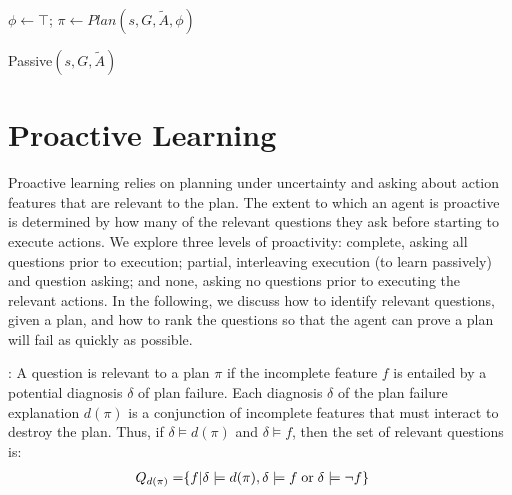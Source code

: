 \documentclass[letterpaper]{article}
\def\und#1{\noindent{\bf #1}:}
\begin{document}
\begin{algorithm}[t]
\SetLine
{}
 $\phi \leftarrow \top$; $\pi \leftarrow Plan(s, G, \tilde{A}, \phi)$\;
\caption{Passive$(s, G, \tilde{A})$}\label{alg:replan}
\end{algorithm}



\section{Proactive Learning}


Proactive learning relies on planning under uncertainty and asking about action
features that are relevant to the plan.  The extent to which an agent is
proactive is determined by how many of the relevant questions they ask before
starting to execute actions.  We explore three levels of proactivity: complete,
asking all questions prior to execution; partial, interleaving execution (to
learn passively) and question asking; and none, asking no questions prior to
executing the relevant actions.  In the following, we discuss how to identify
relevant questions, given a plan, and how to rank the questions so that the
agent can prove a plan will fail as quickly as possible.


\und{Relevant Questions}  A question is relevant to a plan
${\pi}$ if the incomplete feature $f$ is entailed by a potential
diagnosis $\delta$ of plan failure.  Each diagnosis $\delta$ of the plan
failure explanation $d({\pi})$ 
is a conjunction of incomplete features that must interact to destroy the plan. 
Thus, if $\delta \models d({\pi})$ and $\delta \models f$, then the set of
relevant questions is:
\begin{align}
Q_{d(\pi)} =&  \{f | \delta \models d(\pi)
, \delta \models f \;\text{or}\; \delta \models \neg f\}\notag
\end{align}
\end{document}
